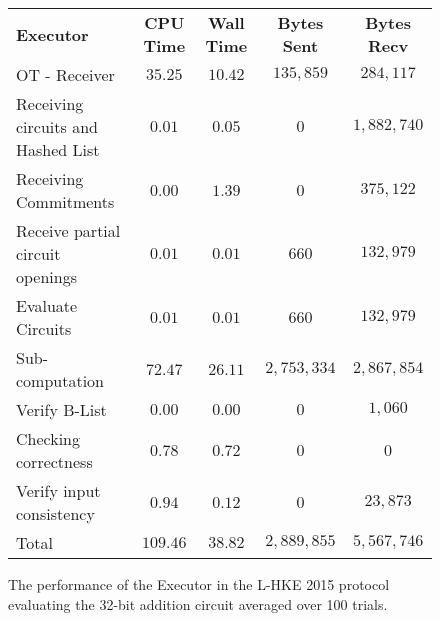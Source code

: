 \documentclass[ %
                    author={Nicholas Tutte},
                supervisor={Prof. Nigel Smart},
                    degree={MEng},
                     title={Secure Two Party Computation},
                  subtitle={A practical comparison of recent protocols},
                      type={Research - GG1K},
                      year={2015} ]{dissertation}
\begin{document}
				\begin{figure}[!ht]
					\begin{tabular}{| p{4.3cm} | c c c c |}
						\hline
						\textbf{Executor} & \textbf{CPU Time} & \textbf{Wall Time} & \textbf{Bytes Sent} & \textbf{Bytes Recv} \\
						\thickhline
						OT - Receiver & $35.25$ & $10.42$ & $135,859$ & $284,117$ \\
						\hline
						Receiving circuits and Hashed List & $0.01$ & $0.05$ & $0$ & $1,882,740$ \\
						\hline
						Receiving Commitments & $0.00$ & $1.39$ & $0$ & $375,122$ \\
						\hline
						Receive partial circuit openings & $0.01$ & $0.01$ & $660$ & $132,979$ \\
						\hline
						Evaluate Circuits & $0.01$ & $0.01$ & $660$ & $132,979$ \\
						\hline
						Sub-computation & $72.47$ & $26.11$ & $2,753,334$ & $2,867,854$ \\
						\hline
						Verify B-List & $0.00$ & $0.00$ & $0$ & $1,060$ \\
						\hline
						Checking correctness & $0.78$ & $0.72$ & $0$ & $0$ \\
						\hline
						Verify input consistency & $0.94$ & $0.12$ & $0$ & $23,873$ \\
						\thickhline
						Total & $109.46$ & $38.82$ & $2,889,855$ & $5,567,746$ \\
						\hline
					\end{tabular}
					\caption{The performance of the Executor in the L-HKE 2015 protocol evaluating the 32-bit addition circuit averaged over 100 trials. \label{table:L-HKE_2015_Add_Executor}}
				\end{figure}
\end{document}
